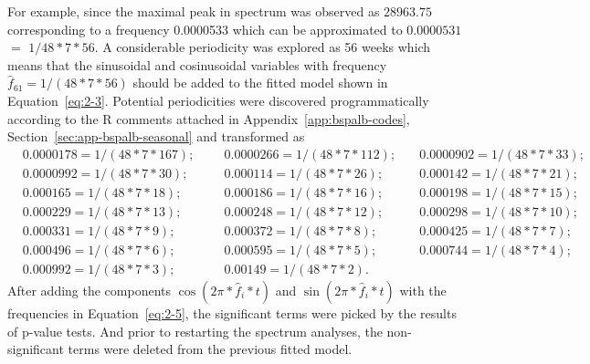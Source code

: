 \documentclass[12pt,msc]{uom_eee_dissertation_casson}
\newcommand{\secref}[1]{Section~\ref{#1}}
\newcommand{\appref}[1]{Appendix~\ref{#1}}
\newcommand{\eqnref}[1]{Equation~\eqref{#1}}
\begin{document}
For example, since the maximal peak in spectrum was observed as $28963.75$ corresponding to a frequency 0.0000533 which can be approximated to $0.0000531$ $=$ $1/48*7*56$. A considerable periodicity was explored as 56 weeks which means that the sinusoidal and cosinusoidal variables with frequency $\hat{f}_{61}=1/(48*7*56)$ should be added to the fitted model shown in \eqnref{eq:2-3}. Potential periodicities were discovered programmatically according to the R comments attached in \appref{app:bspalb-codes}, \secref{sec:app-bspalb-seasonal} and transformed as
\begin{equation}
\label{eq:2-5}
\begin{aligned}
&0.0000178 =1/(48*7*167);\quad&0.0000266 =1/(48*7*112); \quad&0.0000902 =1/(48*7*33);\\
&0.0000992 =1/(48*7*30); \qquad&0.000114 =1/(48*7*26);  \quad &0.000142 =1/(48*7*21);\\
&0.000165 =1/(48*7*18);  \qquad&0.000186 =1/(48*7*16);  \quad &0.000198 =1/(48*7*15);\\
&0.000229 =1/(48*7*13);  \qquad&0.000248 =1/(48*7*12);  \quad &0.000298 =1/(48*7*10);\\
&0.000331 =1/(48*7*9);   \qquad&0.000372 =1/(48*7*8);   \quad &0.000425 =1/(48*7*7);\\
&0.000496 =1/(48*7*6);   \qquad&0.000595 =1/(48*7*5);   \quad &0.000744 =1/(48*7*4);\\
&0.000992 =1/(48*7*3);        &0.00149 =1/(48*7*2).\quad
\end{aligned}
\end{equation}
After adding the components $\cos(2\pi *\hat{f}_{i}*t)$ and $\sin(2\pi *\hat{f}_{i}*t)$ with the frequencies in \eqnref{eq:2-5}, the significant terms were picked by the results of p-value tests. And prior to restarting the spectrum analyses, the non-significant terms were deleted from the previous fitted model.
\end{document}

